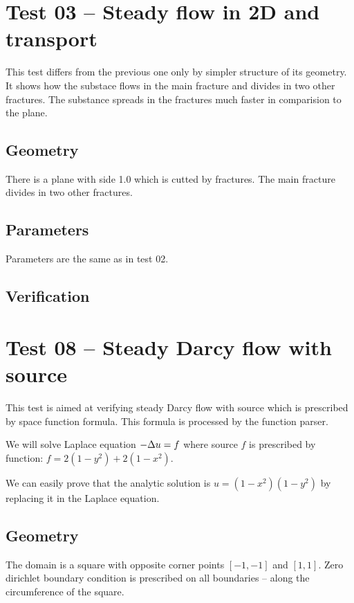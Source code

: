 \section{Test 03 -- Steady flow in 2D and transport}
\label{sec:test03}
This test differs from the previous one only by simpler structure of its geometry. It shows how the substace flows in the main fracture and divides in two other fractures. The substance spreads in the fractures much faster in comparision to the plane.
\subsection*{Geometry}
There is a plane with side 1.0 which is cutted by fractures. The main fracture divides in two other fractures.
\subsection*{Parameters}
Parameters are the same as in test 02.
\subsection*{Verification}



\section{Test 08 -- Steady Darcy flow with source}
\label{sec:test08}
This test is aimed at verifying steady Darcy flow with source which is prescribed by space function formula. This formula is processed by the function parser.

We will solve Laplace equation $-\Delta{}u = f$ where source $f$ is prescribed by function: $f = 2(1-y^2) + 2(1-x^2)$.

We can easily prove that the analytic solution is $u = (1-x^2)(1-y^2)$ by replacing it in the Laplace equation.

\subsection*{Geometry}
The domain is a square with opposite corner points $[-1,-1]$ and $[1,1]$. Zero dirichlet boundary condition is prescribed on all boundaries -- along the circumference of the square.
 
